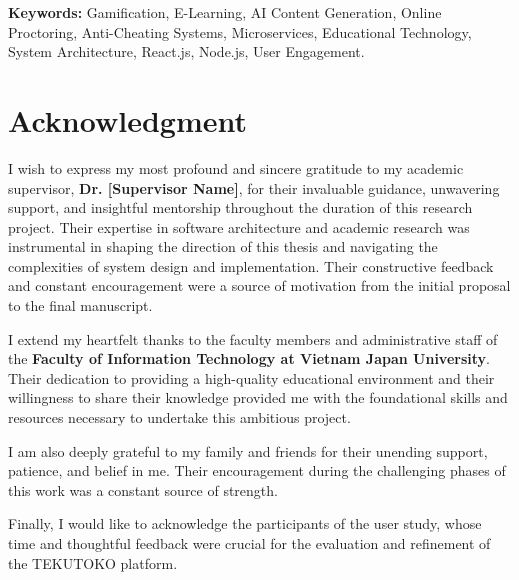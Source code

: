 \vspace{1cm}
\noindent\textbf{Keywords:} Gamification, E-Learning, AI Content Generation, Online Proctoring, Anti-Cheating Systems, Microservices, Educational Technology, System Architecture, React.js, Node.js, User Engagement.

\cleardoublepage

\chapter*{Acknowledgment}
I wish to express my most profound and sincere gratitude to my academic supervisor, \textbf{Dr. [Supervisor Name]}, for their invaluable guidance, unwavering support, and insightful mentorship throughout the duration of this research project. Their expertise in software architecture and academic research was instrumental in shaping the direction of this thesis and navigating the complexities of system design and implementation. Their constructive feedback and constant encouragement were a source of motivation from the initial proposal to the final manuscript.

I extend my heartfelt thanks to the faculty members and administrative staff of the \textbf{Faculty of Information Technology at Vietnam Japan University}. Their dedication to providing a high-quality educational environment and their willingness to share their knowledge provided me with the foundational skills and resources necessary to undertake this ambitious project.

I am also deeply grateful to my family and friends for their unending support, patience, and belief in me. Their encouragement during the challenging phases of this work was a constant source of strength.

Finally, I would like to acknowledge the participants of the user study, whose time and thoughtful feedback were crucial for the evaluation and refinement of the TEKUTOKO platform.